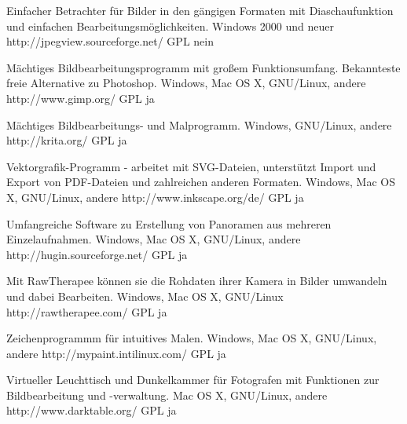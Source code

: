 



{Einfacher Betrachter für Bilder in den gängigen Formaten mit Diaschaufunktion und einfachen Bearbeitungsmöglichkeiten.}
{Windows 2000 und neuer}
{http://jpegview.sourceforge.net/}
{GPL}
{nein}

{Mächtiges Bildbearbeitungsprogramm mit großem Funktionsumfang. Bekannteste freie Alternative zu Photoshop.}
{Windows, Mac OS X, GNU/Linux, andere}
{http://www.gimp.org/}
{GPL}
{ja}

{Mächtiges Bildbearbeitungs- und Malprogramm.}
{Windows, GNU/Linux, andere}
{http://krita.org/}
{GPL}
{ja}

{Vektorgrafik-Programm - arbeitet mit SVG-Dateien, unterstützt Import und Export von PDF-Dateien und zahlreichen anderen Formaten.}
{Windows, Mac OS X, GNU/Linux, andere}
{http://www.inkscape.org/de/}
{GPL}
{ja}


{Umfangreiche Software zu Erstellung von Panoramen aus mehreren Einzelaufnahmen.}
{Windows, Mac OS X, GNU/Linux, andere}
{http://hugin.sourceforge.net/}
{GPL}
{ja}

{Mit RawTherapee können sie die Rohdaten ihrer Kamera in Bilder umwandeln und dabei Bearbeiten.}
{Windows, Mac OS X, GNU/Linux}
{http://rawtherapee.com/ }
{GPL}
{ja}

{Zeichenprogrammm für intuitives Malen.}
{Windows, Mac OS X, GNU/Linux, andere}
{http://mypaint.intilinux.com/}
{GPL}
{ja}

{Virtueller Leuchttisch und Dunkelkammer für Fotografen mit Funktionen zur Bildbearbeitung und -verwaltung.}
{Mac OS X, GNU/Linux, andere}
{http://www.darktable.org/}
{GPL}
{ja}

\backpage


